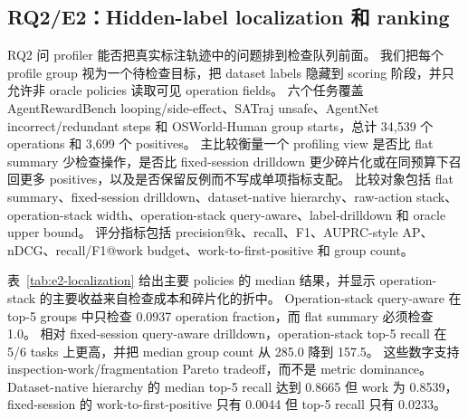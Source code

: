 \documentclass[10pt,twocolumn]{ctexart}
\begin{document}
\subsection{RQ2/E2：Hidden-label localization 和 ranking}

RQ2 问 profiler 能否把真实标注轨迹中的问题排到检查队列前面。
我们把每个 profile group 视为一个待检查目标，把 dataset labels 隐藏到 scoring 阶段，并只允许非 oracle policies 读取可见 operation fields。
六个任务覆盖 AgentRewardBench looping/side-effect、SATraj unsafe、AgentNet incorrect/redundant steps 和 OSWorld-Human group starts，总计 34,539 个 operations 和 3,699 个 positives。
主比较衡量一个 profiling view 是否比 flat summary 少检查操作，是否比 fixed-session drilldown 更少碎片化或在同预算下召回更多 positives，以及是否保留反例而不写成单项指标支配。
比较对象包括 flat summary、fixed-session drilldown、dataset-native hierarchy、raw-action stack、operation-stack width、operation-stack query-aware、label-drilldown 和 oracle upper bound。
评分指标包括 precision@k、recall、F1、AUPRC-style AP、nDCG、recall/F1@work budget、work-to-first-positive 和 group count。

表~\ref{tab:e2-localization} 给出主要 policies 的 median 结果，并显示 operation-stack 的主要收益来自检查成本和碎片化的折中。
Operation-stack query-aware 在 top-5 groups 中只检查 0.0937 operation fraction，而 flat summary 必须检查 1.0。
相对 fixed-session query-aware drilldown，operation-stack top-5 recall 在 5/6 tasks 上更高，并把 median group count 从 285.0 降到 157.5。
这些数字支持 inspection-work/fragmentation Pareto tradeoff，而不是 metric dominance。
Dataset-native hierarchy 的 median top-5 recall 达到 0.8665 但 work 为 0.8539，fixed-session 的 work-to-first-positive 只有 0.0044 但 top-5 recall 只有 0.0233。
\end{document}
